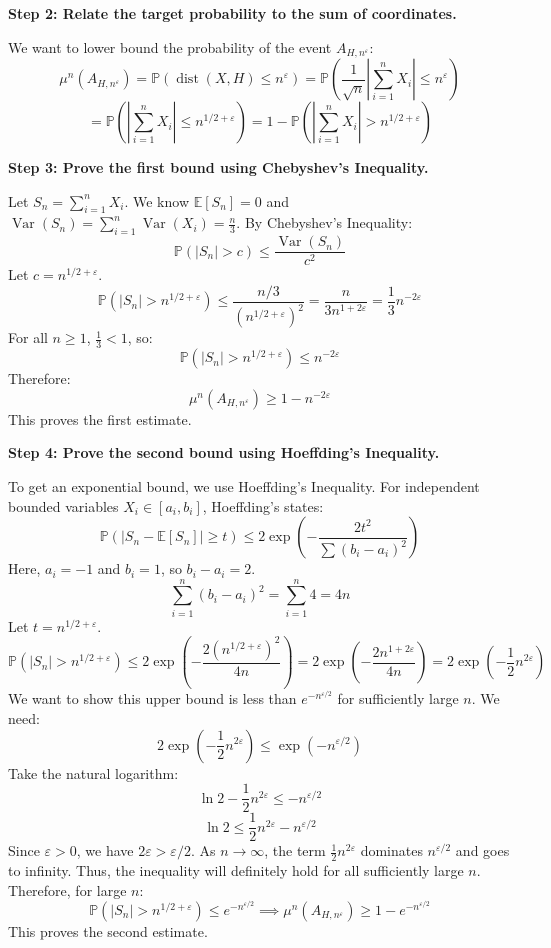 \begin{solution}
\textbf{Step 2: Relate the target probability to the sum of coordinates.}

We want to lower bound the probability of the event $A_{H, n^\varepsilon}$:
\[ \mu^n(A_{H, n^\varepsilon}) = \mathbb{P}\left( \operatorname{dist}(X, H) \leq n^\varepsilon \right) = \mathbb{P}\left( \frac{1}{\sqrt{n}} \left| \sum_{i=1}^n X_i \right| \leq n^\varepsilon \right) \]
\[ = \mathbb{P}\left( \left| \sum_{i=1}^n X_i \right| \leq n^{1/2 + \varepsilon} \right) = 1 - \mathbb{P}\left( \left| \sum_{i=1}^n X_i \right| > n^{1/2 + \varepsilon} \right) \]

\textbf{Step 3: Prove the first bound using Chebyshev's Inequality.}

Let $S_n = \sum_{i=1}^n X_i$. We know $\mathbb{E}[S_n] = 0$ and $\operatorname{Var}(S_n) = \sum_{i=1}^n \operatorname{Var}(X_i) = \frac{n}{3}$.
By Chebyshev's Inequality:
\[ \mathbb{P}(|S_n| > c) \leq \frac{\operatorname{Var}(S_n)}{c^2} \]
Let $c = n^{1/2 + \varepsilon}$.
\[ \mathbb{P}(|S_n| > n^{1/2 + \varepsilon}) \leq \frac{n/3}{(n^{1/2 + \varepsilon})^2} = \frac{n}{3 n^{1 + 2\varepsilon}} = \frac{1}{3} n^{-2\varepsilon} \]
For all $n \geq 1$, $\frac{1}{3} < 1$, so:
\[ \mathbb{P}(|S_n| > n^{1/2 + \varepsilon}) \leq n^{-2\varepsilon} \]
Therefore:
\[ \mu^n(A_{H, n^\varepsilon}) \geq 1 - n^{-2\varepsilon} \]
This proves the first estimate.

\textbf{Step 4: Prove the second bound using Hoeffding's Inequality.}

To get an exponential bound, we use Hoeffding's Inequality.
For independent bounded variables $X_i \in [a_i, b_i]$, Hoeffding's states:
\[ \mathbb{P}(|S_n - \mathbb{E}[S_n]| \geq t) \leq 2 \exp\left( - \frac{2t^2}{\sum (b_i - a_i)^2} \right) \]
Here, $a_i = -1$ and $b_i = 1$, so $b_i - a_i = 2$.
\[ \sum_{i=1}^n (b_i - a_i)^2 = \sum_{i=1}^n 4 = 4n \]
Let $t = n^{1/2 + \varepsilon}$.
\[ \mathbb{P}(|S_n| > n^{1/2 + \varepsilon}) \leq 2 \exp\left( - \frac{2(n^{1/2 + \varepsilon})^2}{4n} \right) = 2 \exp\left( - \frac{2 n^{1 + 2\varepsilon}}{4n} \right) = 2 \exp\left( - \frac{1}{2} n^{2\varepsilon} \right) \]
We want to show this upper bound is less than $e^{-n^{\varepsilon/2}}$ for sufficiently large $n$.
We need:
\[ 2 \exp\left( - \frac{1}{2} n^{2\varepsilon} \right) \leq \exp\left( - n^{\varepsilon/2} \right) \]
Take the natural logarithm:
\[ \ln 2 - \frac{1}{2} n^{2\varepsilon} \leq - n^{\varepsilon/2} \]
\[ \ln 2 \leq \frac{1}{2} n^{2\varepsilon} - n^{\varepsilon/2} \]
Since $\varepsilon > 0$, we have $2\varepsilon > \varepsilon/2$. As $n \to \infty$, the term $\frac{1}{2} n^{2\varepsilon}$ dominates $n^{\varepsilon/2}$ and goes to infinity.
Thus, the inequality will definitely hold for all sufficiently large $n$.
Therefore, for large $n$:
\[ \mathbb{P}(|S_n| > n^{1/2 + \varepsilon}) \leq e^{-n^{\varepsilon/2}} \implies \mu^n(A_{H, n^\varepsilon}) \geq 1 - e^{-n^{\varepsilon/2}} \]
This proves the second estimate.
\end{solution}

